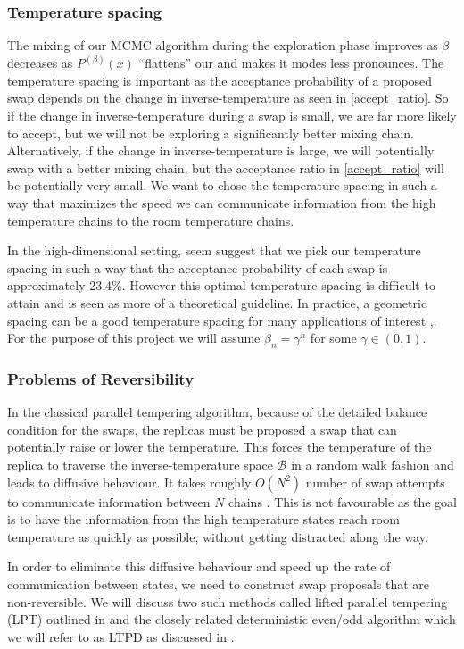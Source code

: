 \subsubsection{Temperature spacing}
The mixing of our MCMC algorithm during the exploration phase improves as $\beta$ decreases as $P^{(\beta)}(x)$ ``flattens'' our and makes it modes less pronounces. The temperature spacing is important as the acceptance probability of a proposed swap depends on the change in inverse-temperature as seen in \eqref{accept_ratio}. So if the change in inverse-temperature during a swap is small, we are far more likely to accept, but we will not be exploring a significantly better mixing chain. Alternatively, if the change in inverse-temperature is large, we will potentially swap with a better mixing chain, but the acceptance ratio in \eqref{accept_ratio} will be potentially very small. We want to chose the temperature spacing in such a way that maximizes the speed we can communicate information from the high temperature chains to the room temperature chains.

In the high-dimensional setting, \cite{atchade_towards_2011} seem suggest that we pick our temperature spacing in such a way that the acceptance probability of each swap is approximately 23.4\%. However this optimal temperature spacing is difficult to attain and is seen as more of a theoretical guideline. In practice, a geometric spacing can be a good temperature spacing for many applications of interest \cite{atchade_towards_2011},\cite{kofke2002acceptance}. For the purpose of this project we will assume $\beta_n=\gamma^n$ for some $\gamma\in (0,1)$.
\subsubsection{Problems of Reversibility}
In the classical parallel tempering algorithm, because of the detailed balance condition for the swaps, the replicas must be proposed a swap that can potentially raise or lower the temperature. This forces the temperature of the replica to traverse the inverse-temperature space $\mathcal{B}$ in a random walk fashion and leads to diffusive behaviour. It takes roughly $O(N^2)$ number of swap attempts  to communicate information between $N$ chains \cite{diaconis2000analysis}. This is not favourable as the goal is to have the information from the high temperature states reach room temperature as quickly as possible, without getting distracted along the way. 

In order to eliminate this diffusive behaviour and speed up the rate of communication between states, we need to construct swap proposals that are non-reversible. We will discuss two such methods called lifted parallel tempering (LPT) outlined in \cite{wu_irreversible_2017} and the closely related deterministic even/odd algorithm which we will refer to as LTPD as discussed in \cite{lingenheil2009efficiency}. 

